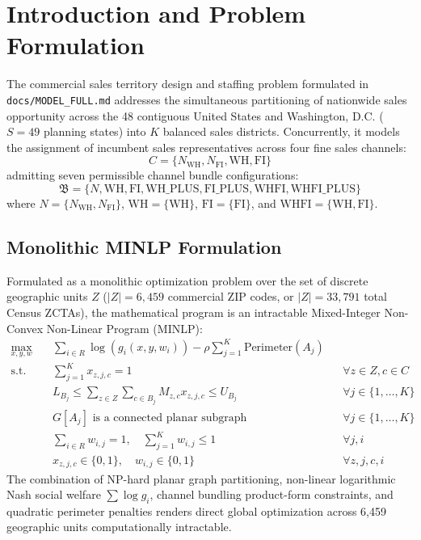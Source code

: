 \documentclass[11pt,a4paper]{article}
\theoremstyle{plain}
\theoremstyle{definition}
\begin{document}
\section{Introduction and Problem Formulation}

The commercial sales territory design and staffing problem formulated in \texttt{docs/MODEL\_FULL.md} addresses the simultaneous partitioning of nationwide sales opportunity across the 48 contiguous United States and Washington, D.C. ($S=49$ planning states) into $K$ balanced sales districts. Concurrently, it models the assignment of incumbent sales representatives across four fine sales channels:
\begin{equation}
C = \{N_{\text{WH}}, N_{\text{FI}}, \text{WH}, \text{FI}\}
\end{equation}
admitting seven permissible channel bundle configurations:
\begin{equation}
\mathfrak{B} = \{N, \text{WH}, \text{FI}, \text{WH\_PLUS}, \text{FI\_PLUS}, \text{WHFI}, \text{WHFI\_PLUS}\}
\end{equation}
where $N = \{N_{\text{WH}}, N_{\text{FI}}\}$, $\text{WH} = \{\text{WH}\}$, $\text{FI} = \{\text{FI}\}$, and $\text{WHFI} = \{\text{WH}, \text{FI}\}$.

\subsection{Monolithic MINLP Formulation}
Formulated as a monolithic optimization problem over the set of discrete geographic units $Z$ ($|Z| = 6,459$ commercial ZIP codes, or $|Z| = 33,791$ total Census ZCTAs), the mathematical program is an intractable Mixed-Integer Non-Convex Non-Linear Program (MINLP):
\begin{align}
    \max_{x, y, w} \quad & \sum_{i \in R} \log\left( g_i(x, y, w_i) \right) - \rho \sum_{j=1}^K \text{Perimeter}(A_j) \label{eq:minlp_obj} \\
    \text{s.t.} \quad & \sum_{j=1}^K x_{z, j, c} = 1 && \forall z \in Z, c \in C \label{eq:minlp_part} \\
    & L_{B_j} \le \sum_{z \in Z} \sum_{c \in B_j} M_{z,c} x_{z,j,c} \le U_{B_j} && \forall j \in \{1, \dots, K\} \label{eq:minlp_cap} \\
    & G[A_j] \text{ is a connected planar subgraph} && \forall j \in \{1, \dots, K\} \label{eq:minlp_contig} \\
    & \sum_{i \in R} w_{i,j} = 1, \quad \sum_{j=1}^K w_{i,j} \le 1 && \forall j, i \label{eq:minlp_match} \\
    & x_{z,j,c} \in \{0, 1\}, \quad w_{i,j} \in \{0, 1\} && \forall z, j, c, i \label{eq:minlp_bin}
\end{align}
The combination of NP-hard planar graph partitioning, non-linear logarithmic Nash social welfare $\sum \log g_i$, channel bundling product-form constraints, and quadratic perimeter penalties renders direct global optimization across 6,459 geographic units computationally intractable.
\end{document}
